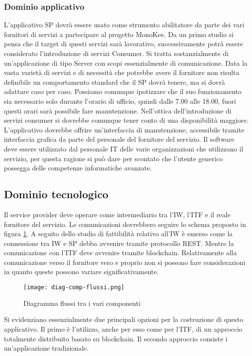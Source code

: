\subsubsection{Dominio applicativo}
L’applicativo SP dovrà essere usato come strumento abilitatore da parte dei vari fornitori di servizi a partecipare al progetto MonoKee. Da un primo studio si pensa che il target di questi servizi sarà lavorativo, successivamente potrà essere considerato l’introduzione di servizi Consumer. Si tratta sostanzialmente di un’applicazione di tipo Server con scopi essenzialmente di comunicazione. Data la vasta varietà di servizi e di necessità che potrebbe avere il fornitore non risulta definibile un comportamento standard che il SP dovrà tenere, ma si dovrà adattare caso per caso. Possiamo comunque ipotizzare che il suo funzionamento sia necessario solo durante l’orario di ufficio, quindi dalle 7.00 alle 18.00, fuori questi orari sarà possibile fare manutenzione. Nell’ottica dell’introduzione di servizi consumer si dovrebbe comunque tener conto di una disponibilità maggiore. L’applicativo dovrebbe offrire un’interfaccia di manutenzione, accessibile tramite interfaccia grafica da parte del personale del fornitore del servizio. Il software deve essere utilizzato dal personale IT delle varie organizzazioni che utilizzano il servizio, per questa ragione si può dare per scontato che l’utente generico possegga delle competenze informatiche avanzate. 
\subsection{Dominio tecnologico}
Il service provider deve operare come intermediario tra l’IW, l’ITF e il reale fornitore del servizio. Le comunicazioni dovrebbero seguire lo schema proposto in figura \ref{fig:diag-flussi}. 
A seguito dello studio di fattibilità relativo all’IW è emerso come la connessione tra IW e SP debba avvenire tramite protocollo REST. Mentre la comunicazione con l’ITF deve avvenire tramite blockchain. Relativamente alla comunicazione verso il fornitore vero e proprio non si possono fare considerazioni in quanto queste possono variare significativamente.

\begin{figure}[!h]
    \centering
    \texttt{[image: diag-comp-flussi.png]} 
    \caption{Diagramma flussi tra i vari componenti}
    \label{fig:diag-flussi} 
\end{figure}
Si evidenziano essenzialmente due principali opzioni per la costruzione di questo applicativo. Il primo è l’utilizzo, anche per esso come per l’ITF, di un approccio totalmente distribuito basato su blockchain.  Il secondo approccio consiste i un’applicazione tradizionale.  
